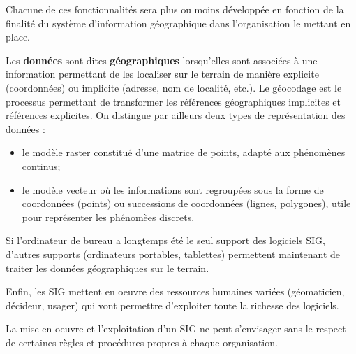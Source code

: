 \documentclass[11pt]{article}
\begin{document}
Chacune de ces fonctionnalités sera plus ou moins développée en fonction de la finalité du système d'information géographique dans l'organisation le mettant en place.

Les \textbf{données} sont dites \textbf{géographiques} lorsqu'elles sont associées à une information permettant de les localiser sur le terrain de manière explicite (coordonnées) ou implicite (adresse, nom de localité, etc.). Le géocodage est le processus permettant de transformer les références géographiques implicites et références explicites. On distingue par ailleurs deux types de représentation des données :
\begin{itemize}
	\item le modèle raster constitué d'une matrice de points, adapté aux phénomènes continus;
	\item le modèle vecteur où les informations sont regroupées sous la forme de coordonnées (points) ou successions de coordonnées (lignes, polygones), utile pour représenter les phénomèes discrets.
\end{itemize}

Si l'ordinateur de bureau a longtemps été le seul support des logiciels SIG, d'autres supports (ordinateurs portables, tablettes) permettent maintenant de traiter les données géographiques sur le terrain.

Enfin, les SIG mettent en oeuvre des ressources humaines variées (géomaticien, décideur, usager) qui vont permettre d'exploiter toute la richesse des logiciels.

La mise en oeuvre et l’exploitation d’un SIG ne peut s'envisager sans le respect de certaines règles et procédures propres à chaque organisation. 
\end{document}
